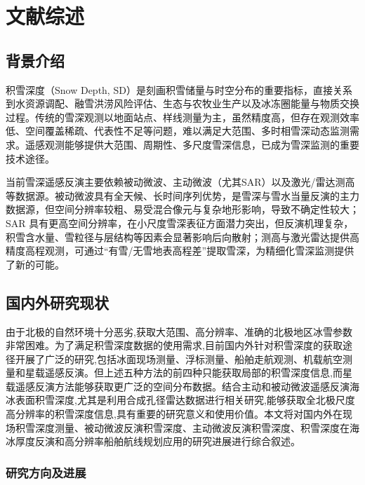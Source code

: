 \cleardoublepage
\newrefsection
\chapter{文献综述}

\section{背景介绍}
积雪深度（Snow Depth, SD）是刻画积雪储量与时空分布的重要指标，直接关系到水资源调配、融雪洪涝风险评估、生态与农牧业生产以及冰冻圈能量与物质交换过程。传统的雪深观测以地面站点、样线测量为主，虽然精度高，但存在观测效率低、空间覆盖稀疏、代表性不足等问题，难以满足大范围、多时相雪深动态监测需求。遥感观测能够提供大范围、周期性、多尺度雪深信息，已成为雪深监测的重要技术途径。

当前雪深遥感反演主要依赖被动微波、主动微波（尤其SAR）以及激光/雷达测高等数据源。被动微波具有全天候、长时间序列优势，是雪深与雪水当量反演的主力数据源，但空间分辨率较粗、易受混合像元与复杂地形影响，导致不确定性较大；SAR 具有更高空间分辨率，在小尺度雪深表征方面潜力突出，但反演机理复杂，积雪含水量、雪粒径与层结构等因素会显著影响后向散射；测高与激光雷达提供高精度高程观测，可通过“有雪/无雪地表高程差”提取雪深，为精细化雪深监测提供了新的可能。

\section{国内外研究现状}
由于北极的自然环境十分恶劣,获取大范围、高分辨率、准确的北极地区冰雪参数非常困难。为了满足积雪深度数据的使用需求,目前国内外针对积雪深度的获取途径开展了广泛的研究,包括冰面现场测量、浮标测量、船舶走航观测、机载航空测量和星载遥感反演。但上述五种方法的前四种只能获取局部的积雪深度信息,而星载遥感反演方法能够获取更广泛的空间分布数据。结合主动和被动微波遥感反演海冰表面积雪深度,尤其是利用合成孔径雷达数据进行相关研究,能够获取全北极尺度高分辨率的积雪深度信息,具有重要的研究意义和使用价值。本文将对国内外在现场积雪深度测量、被动微波反演积雪深度、主动微波反演积雪深度、积雪深度在海冰厚度反演和高分辨率船舶航线规划应用的研究进展进行综合叙述。
\subsection{研究方向及进展}
